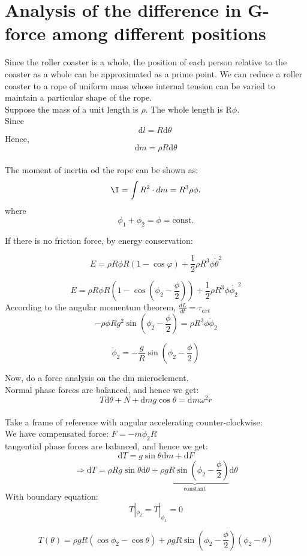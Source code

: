 \documentclass{article}
\begin{document}
\pagebreak
\section{Analysis of the difference in G-force among different positions}
Since the roller coaster is a whole, the position of each person relative to the coaster as a whole can be approximated as a prime point.
We can reduce a roller coaster to a rope of uniform mass whose internal tension can be varied to maintain a particular shape of the rope.\\
Suppose the mass of a unit length is $\rho$. The whole length is R$\phi$.\\
Since
$$
\mathrm{d}l= R\mathrm{d}\theta\ 
$$
Hence,
$$
        \mathrm{d}m=\rho R\mathrm{d}\theta
        $$
\\ The moment of inertia od the rope can be shown as:
$$
\I =\int  R^2 \cdot dm = R^3\rho\phi.
$$
where
    $$
    \phi_1+\phi_2=\phi=\mathrm{const}.
    $$

    If there is no friction force, by energy conservation:

    $$
    E=\rho R\phi R(1-\cos\varphi)+\frac{1}{2}\rho R^3\phi\dot{\theta}^2
    $$

    $$
    E=\rho R\phi R(1-\cos(\phi_2-\frac{\phi}{2}))+\frac{1}{2}\rho R^3\phi\dot{\phi_2}^2
    $$
    According to the angular momentum theorem, $ \frac{dL}{dt}=\tau_{ext}$
    $$
    -\rho\phi Rg^2\sin(\phi_2-\frac{\phi}{2})=\rho R^3\phi\ddot{\phi}_2
    $$

    $$
    \ddot{\phi}_2=-\frac{g}{R}\sin(\phi_2-\frac{\phi}{2})
    $$

    
    Now, do a force analysis on the dm microelement.
    \\ Normal phase forces are balanced, and hence we get:
    $$
    T\mathrm{d}\theta+N+\mathrm{d}mg\cos\theta=\mathrm{d}m\omega^2r
    $$
    \\Take a frame of reference with angular accelerating counter-clockwise:
    \\We have compensated force: $F=-m \ddot{\phi}_2 R$
    \\ tangential phase forces are balanced, and hence we get:
    $$
   \mathrm{d}T=g\sin\theta\mathrm{d}m + \mathrm{d} F
    $$
   $$
    \Rightarrow\mathrm{d}T=\rho Rg\sin\theta\mathrm{d}\theta+\underbrace{\rho gR\sin(\phi_2-\frac{\phi}{2})}_{\mathrm{constant}}\mathrm{d}\theta
    $$
With boundary equation:
    $$
    T|_{\phi_2}=T|_{\phi_1}=0
    $$

    \begin{equation}
        T(\theta)=\rho gR(\cos{\phi_2}-\cos\theta)+\rho gR\sin(\phi_2-\frac{\phi}{2})(\phi_2-\theta)
    \end{equation}
\end{document}
